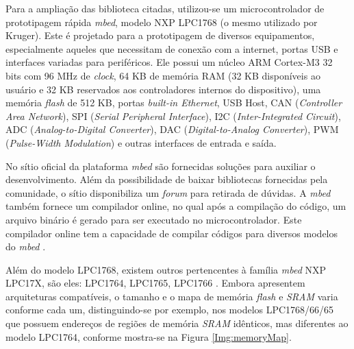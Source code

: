 Para a ampliação das biblioteca citadas, utilizou-se um microcontrolador de prototipagem rápida \textit{mbed}, modelo NXP LPC1768 \cite{lpc1768:2016} (o mesmo utilizado por Kruger). Este é projetado para a prototipagem de diversos equipamentos, especialmente aqueles que necessitam de conexão com a internet, portas USB e interfaces variadas para periféricos. Ele possui um núcleo ARM Cortex-M3 32 bits com 96 MHz de \textit{clock}, 64 KB de memória RAM (32 KB disponíveis ao usuário e 32 KB reservados aos controladores internos do dispositivo), uma memória \textit{flash} de 512 KB, portas \textit{built-in Ethernet}, USB Host, CAN (\textit{Controller Area Network}), SPI (\textit{Serial Peripheral Interface}), I2C (\textit{Inter-Integrated Circuit}), ADC (\textit{Analog-to-Digital Converter}), DAC (\textit{Digital-to-Analog Converter}), PWM (\textit{Pulse-Width Modulation}) e outras interfaces de entrada e saída.

No sítio oficial da plataforma \textit{mbed} são fornecidas soluções para auxiliar o desenvolvimento. Além da possibilidade de baixar bibliotecas fornecidas pela comunidade, o sítio disponibiliza um \textit{forum} para retirada de dúvidas. A \textit{mbed} também fornece um compilador online, no qual após a compilação do código, um arquivo binário é gerado para ser executado no microcontrolador. Este compilador online tem a capacidade de compilar códigos para diversos modelos do \textit{mbed} \cite{mbedCompiler:2016}.

Além do modelo LPC1768, existem outros pertencentes à família \textit{mbed} NXP LPC17X, são eles: LPC1764, LPC1765, LPC1766 \cite{manualLpc176x:2016}. Embora apresentem arquiteturas compatíveis, o tamanho e o mapa de memória \textit{flash} e \textit{SRAM} varia conforme cada um, distinguindo-se por exemplo, nos modelos LPC1768/66/65 que possuem endereços de regiões de memória \textit{SRAM} idênticos, mas diferentes ao modelo LPC1764, conforme mostra-se na Figura \ref{Img:memoryMap}.



